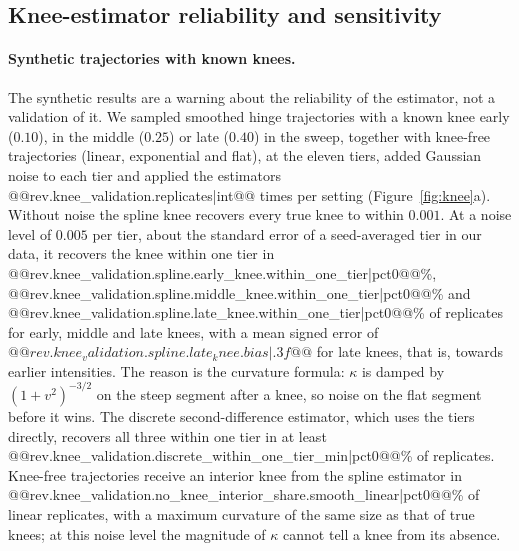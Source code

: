 \documentclass[pdflatex,sn-mathphys]{sn-jnl}
\theoremstyle{thmstyleone}
\theoremstyle{thmstyletwo}
\theoremstyle{thmstylethree}
\begin{document}
\subsection{Knee-estimator reliability and sensitivity}\label{sec:res:knee}

\paragraph{Synthetic trajectories with known knees.} The synthetic results are a warning about the reliability of the estimator, not a validation of it. We sampled smoothed hinge trajectories with a known knee early ($0.10$), in the middle ($0.25$) or late ($0.40$) in the sweep, together with knee-free trajectories (linear, exponential and flat), at the eleven tiers, added Gaussian noise to each tier and applied the estimators @@{rev.knee_validation.replicates|int}@@ times per setting (Figure~\ref{fig:knee}a). Without noise the spline knee recovers every true knee to within $0.001$. At a noise level of $0.005$ per tier, about the standard error of a seed-averaged tier in our data, it recovers the knee within one tier in @@{rev.knee_validation.spline.early_knee.within_one_tier|pct0}@@\%, @@{rev.knee_validation.spline.middle_knee.within_one_tier|pct0}@@\% and @@{rev.knee_validation.spline.late_knee.within_one_tier|pct0}@@\% of replicates for early, middle and late knees, with a mean signed error of $@@{rev.knee_validation.spline.late_knee.bias|.3f}@@$ for late knees, that is, towards earlier intensities. The reason is the curvature formula: $\kappa$ is damped by $(1+v^2)^{-3/2}$ on the steep segment after a knee, so noise on the flat segment before it wins. The discrete second-difference estimator, which uses the tiers directly, recovers all three within one tier in at least @@{rev.knee_validation.discrete_within_one_tier_min|pct0}@@\% of replicates. Knee-free trajectories receive an interior knee from the spline estimator in @@{rev.knee_validation.no_knee_interior_share.smooth_linear|pct0}@@\% of linear replicates, with a maximum curvature of the same size as that of true knees; at this noise level the magnitude of $\kappa$ cannot tell a knee from its absence.
\end{document}
